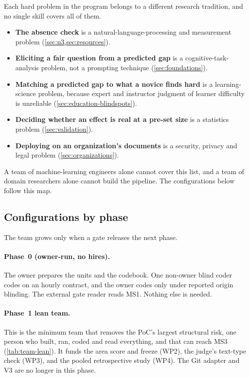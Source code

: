 Each hard problem in the program belongs to a different research tradition, and no single skill
covers all of them.

\begin{itemize}[noitemsep]
  \item \textbf{The absence check} is a natural-language-processing and measurement problem
    (\cref{sec:n3,sec:resources}).
  \item \textbf{Eliciting a fair question from a predicted gap} is a cognitive-task-analysis
    problem, not a prompting technique (\cref{sec:foundations}).
  \item \textbf{Matching a predicted gap to what a novice finds hard} is a learning-science
    problem, because expert and instructor judgment of learner difficulty is unreliable
    (\cref{sec:education-blindspots}).
  \item \textbf{Deciding whether an effect is real at a pre-set size} is a statistics problem
    (\cref{sec:validation}).
  \item \textbf{Deploying on an organization's documents} is a security, privacy and legal problem
    (\cref{sec:organizations}).
\end{itemize}

\evint{} A team of machine-learning engineers alone cannot cover this list, and a team of domain
researchers alone cannot build the pipeline. The configurations below follow this map.

\subsection{Configurations by phase}

The team grows only when a gate releases the next phase.

\paragraph{Phase~0 (owner-run, no hires).} The owner prepares the units and the codebook. One
non-owner blind coder codes on an hourly contract, and the owner codes only under reported origin
blinding. The external gate reader reads MS1. Nothing else is needed.

\paragraph{Phase~1 lean team.} This is the minimum team that removes the PoC's largest structural
risk, one person who built, ran, coded and read everything, and that can reach MS3
(\cref{tab:team-lean}). It funds the area score and freeze (WP2), the judge's text-type check
(WP3), and the pooled retrospective study (WP4). The Git adapter and V3 are no longer in this
phase.

